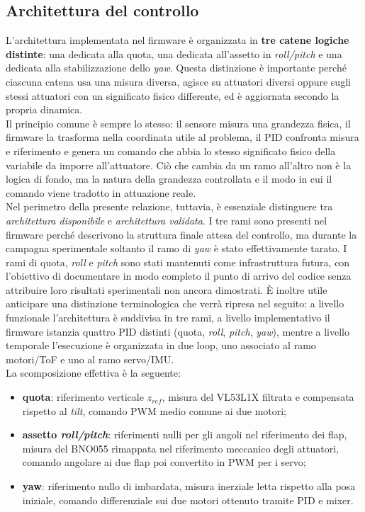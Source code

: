 \documentclass[11pt]{report}
\begin{document}
	\subsection{Architettura del controllo}
	L'architettura implementata nel firmware è organizzata in \textbf{tre catene logiche distinte}: una dedicata alla quota, una dedicata all'assetto in \textit{roll/pitch} e una dedicata alla stabilizzazione dello \textit{yaw}. Questa distinzione è importante perché ciascuna catena usa una misura diversa, agisce su attuatori diversi oppure sugli stessi attuatori con un significato fisico differente, ed è aggiornata secondo la propria dinamica.\\
	Il principio comune è sempre lo stesso: il sensore misura una grandezza fisica, il firmware la trasforma nella coordinata utile al problema, il PID confronta misura e riferimento e genera un comando che abbia lo stesso significato fisico della variabile da imporre all'attuatore. Ciò che cambia da un ramo all'altro non è la logica di fondo, ma la natura della grandezza controllata e il modo in cui il comando viene tradotto in attuazione reale.\\
	Nel perimetro della presente relazione, tuttavia, è essenziale distinguere tra \textit{architettura disponibile} e \textit{architettura validata}. I tre rami sono presenti nel firmware perché descrivono la struttura finale attesa del controllo, ma durante la campagna sperimentale soltanto il ramo di \textit{yaw} è stato effettivamente tarato. I rami di quota, \textit{roll} e \textit{pitch} sono stati mantenuti come infrastruttura futura, con l'obiettivo di documentare in modo completo il punto di arrivo del codice senza attribuire loro risultati sperimentali non ancora dimostrati. È inoltre utile anticipare una distinzione terminologica che verrà ripresa nel seguito: a livello funzionale l'architettura è suddivisa in tre rami, a livello implementativo il firmware istanzia quattro PID distinti (quota, \textit{roll}, \textit{pitch}, \textit{yaw}), mentre a livello temporale l'esecuzione è organizzata in due loop, uno associato al ramo motori/ToF e uno al ramo servo/IMU.\\
	La scomposizione effettiva è la seguente:
	\begin{itemize}
		\item \textbf{quota}: riferimento verticale $z_{ref}$, misura del VL53L1X filtrata e compensata rispetto al \textit{tilt}, comando PWM medio comune ai due motori;
		\item \textbf{assetto \textit{roll/pitch}}: riferimenti nulli per gli angoli nel riferimento dei flap, misura del BNO055 rimappata nel riferimento meccanico degli attuatori, comando angolare ai due flap poi convertito in PWM per i servo;
		\item \textbf{yaw}: riferimento nullo di imbardata, misura inerziale letta rispetto alla posa iniziale, comando differenziale sui due motori ottenuto tramite PID e mixer.
	\end{itemize}
\end{document}
